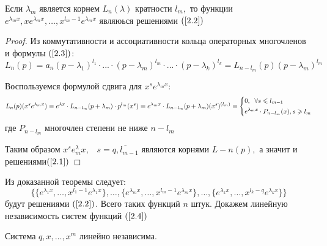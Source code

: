 \begin{theorem}
Если $\lambda_m$ является корнем $L_n(\lambda)$ кратности $l_m,$ то функции $e^{\lambda_m x}, xe^{\lambda_m x},\dots, x^{l_m-1}e^{\lambda_m x}$ являюься решениями $(\ref{2.2})$
\end{theorem}
\begin{proof}
Из коммутативности и ассоциативности кольца операторных многочленов и формулы $(\ref{2.3})$: $L_n(p)=a_n(p-\lambda_1)^{l_1}\cdot ... \cdot (p-\lambda_m)^{l_m}\cdot ... \cdot (p-\lambda_k)^{l_k}=L_{n-l_m}(p)(p-\lambda_m)^{l_m}$\par
Воспользуемся формулой сдвига для $x^se^{\lambda_m x}:$
$$L_n(p)(x^se^{\lambda_m x})=e^{\lambda x}\cdot L_{n-l_m}(p+\lambda_m) \cdot p^{l_m}(x^s)=e^{\lambda_m x}\cdot L_{n-l_m}(p+\lambda_m)(x^s)^{(l_m)}=\left\{\begin{gathered}
    0,\;\;\forall s\leqslant l_{m-1}\hfill
    \\
    e^{\lambda_m x}\cdot P_{n-l_m}(x),s\geqslant l_m \hfill
    \\
\end{gathered}
\right.$$
где $P_{n-l_m}$ многочлен степени не ниже $n-l_m$\par
Таким образом $x^se^\lambda_m x,\;\;\;s=\overline{q,l_{m-1}}$ являются корнями $L-n(p),$ а значит и решениями$(\ref{2.1})$
\end{proof}
Из доказанной теоремы следует:
\begin{equation}
\tag{2.4}
\label{2.4}
    \Bigg\{\{e^{\lambda_1 x},\dots ,x^{l_1-1}e^{\lambda_1 x}\},\dots,\{e^{\lambda_mx},\dots,x^{l_m-1 }e^{\lambda_mx}\},\dots,\{e^{\lambda_k x},\dots, x^{l_k-q}e^{\lambda_k x}\}\Bigg\}
\end{equation}
будут решениями $(\ref{2.2})$. Всего таких функций $n$ штук. Докажем линейную независимость систем функций $(\ref{2.4})$
\begin{lemma}\label{lem1}
Система $q,x,\dots,x^m$ линейно независима. 
\end{lemma}

